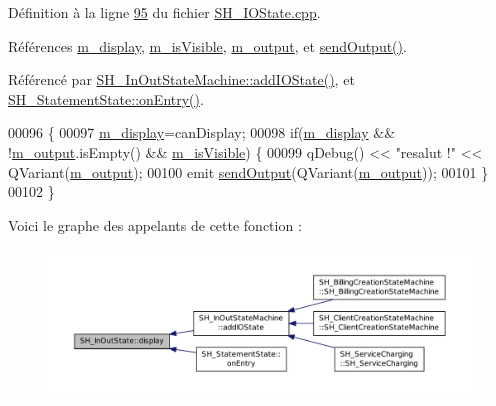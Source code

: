 Définition à la ligne \hyperlink{SH__IOState_8cpp_source_l00095}{95} du fichier \hyperlink{SH__IOState_8cpp_source}{S\-H\-\_\-\-I\-O\-State.\-cpp}.



Références \hyperlink{classSH__InOutState_a3351fa53593266a1ae4334d33d0b1610}{m\-\_\-display}, \hyperlink{classSH__InOutState_a8fd66b185c9a55f0e84daa97e2acf53a}{m\-\_\-is\-Visible}, \hyperlink{classSH__InOutState_ae735e741ce229d2600448d8daa0abc2d}{m\-\_\-output}, et \hyperlink{classSH__InOutState_ad40e929a5537eb1d4883d5aa6eee5b15}{send\-Output()}.



Référencé par \hyperlink{classSH__InOutStateMachine_ad6b778d052f741daee720c047059ce0e}{S\-H\-\_\-\-In\-Out\-State\-Machine\-::add\-I\-O\-State()}, et \hyperlink{classSH__StatementState_ac62f9c27b2966034e56762a6e532dbe4}{S\-H\-\_\-\-Statement\-State\-::on\-Entry()}.


\begin{DoxyCode}
00096 \{
00097     \hyperlink{classSH__InOutState_a3351fa53593266a1ae4334d33d0b1610}{m\_display}=canDisplay;
00098     \textcolor{keywordflow}{if}(\hyperlink{classSH__InOutState_a3351fa53593266a1ae4334d33d0b1610}{m\_display} && !\hyperlink{classSH__InOutState_ae735e741ce229d2600448d8daa0abc2d}{m\_output}.isEmpty() && \hyperlink{classSH__InOutState_a8fd66b185c9a55f0e84daa97e2acf53a}{m\_isVisible}) \{
00099         qDebug() << \textcolor{stringliteral}{"resalut !"} << QVariant(\hyperlink{classSH__InOutState_ae735e741ce229d2600448d8daa0abc2d}{m\_output});
00100         emit \hyperlink{classSH__InOutState_ad40e929a5537eb1d4883d5aa6eee5b15}{sendOutput}(QVariant(\hyperlink{classSH__InOutState_ae735e741ce229d2600448d8daa0abc2d}{m\_output}));
00101     \}
00102 \}
\end{DoxyCode}


Voici le graphe des appelants de cette fonction \-:\nopagebreak
\begin{figure}[H]
\begin{center}
\leavevmode
\includegraphics[width=350pt]{classSH__InOutState_a918e8a7f5fe00dc16004e46eeee1281d_icgraph}
\end{center}
\end{figure}


